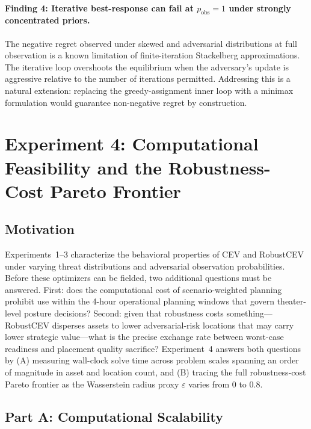 \documentclass[11pt]{article}
\begin{document}
\paragraph{Finding 4: Iterative best-response can fail at $p_\mathrm{obs} = 1$
under strongly concentrated priors.}
The negative regret observed under skewed and adversarial distributions
at full observation is a known limitation of finite-iteration Stackelberg
approximations.  The iterative loop overshoots the equilibrium when the
adversary's update is aggressive relative to the number of iterations
permitted.  Addressing this is a natural extension: replacing the
greedy-assignment inner loop with a minimax formulation would guarantee
non-negative regret by construction.

\section{Experiment 4: Computational Feasibility and the Robustness-Cost Pareto Frontier}
\label{sec:exp4}

\subsection{Motivation}

Experiments~1--3 characterize the behavioral properties of CEV and RobustCEV
under varying threat distributions and adversarial observation probabilities.
Before these optimizers can be fielded, two additional questions must be answered.
First: does the computational cost of scenario-weighted planning prohibit
use within the 4-hour operational planning windows that govern theater-level
posture decisions?  Second: given that robustness costs something---RobustCEV
disperses assets to lower adversarial-risk locations that may carry lower
strategic value---what is the precise exchange rate between worst-case
readiness and placement quality sacrifice?  Experiment~4 answers both
questions by (A) measuring wall-clock solve time across problem scales
spanning an order of magnitude in asset and location count, and (B) tracing
the full robustness-cost Pareto frontier as the Wasserstein radius proxy
$\varepsilon$ varies from 0 to 0.8.

\subsection{Part A: Computational Scalability}
\label{sec:exp4:partA}
\end{document}
